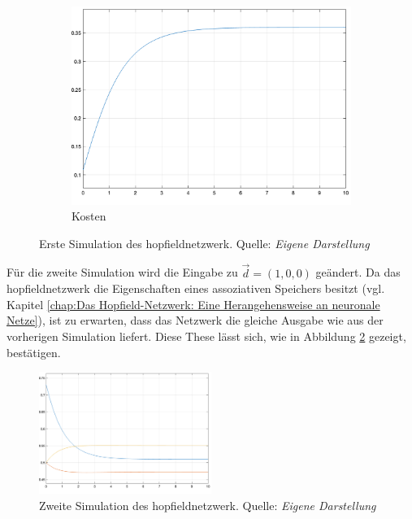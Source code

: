 \begin{figure}[h]
\begin{subfigure}[b]{0.32\textwidth}
    \includegraphics[width=\textwidth]{abbildungen/hnn_simulation_1_kostenfunktion.png}
    \caption{Kosten}
  \end{subfigure}
  \caption{Erste Simulation des \gls{hopfieldnetzwerk}. Quelle: \textit{Eigene Darstellung}}
  \label{fig:Simulation HNN 1}
\end{figure}

Für die zweite Simulation wird die Eingabe zu \(\vec{d}=(1,0,0)\) geändert. Da das \gls{hopfieldnetzwerk} die Eigenschaften eines assoziativen Speichers besitzt (vgl. Kapitel \ref{chap:Das Hopfield-Netzwerk: Eine Herangehensweise an neuronale Netze}), ist zu erwarten, dass das Netzwerk die gleiche Ausgabe wie aus der vorherigen Simulation liefert. Diese These lässt sich, wie in Abbildung \ref{fig:Simulation HNN 2} gezeigt, bestätigen.

\begin{figure}[h]
  \centering
  \includegraphics[width=0.5\textwidth]{abbildungen/hnn_simulation_2_ausgabe.png}
  \caption{Zweite Simulation des \gls{hopfieldnetzwerk}. Quelle: \textit{Eigene Darstellung}}
  \label{fig:Simulation HNN 2}
\end{figure}

